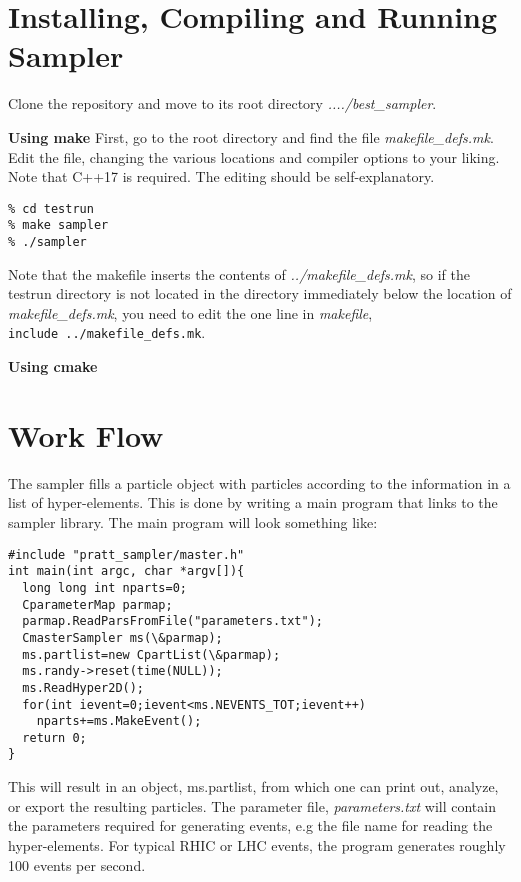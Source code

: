 



\section{Installing, Compiling and Running Sampler}

Clone the repository and move to its root directory {\it ..../best\_sampler}.

{\bf Using make}
First, go to the root directory and find the file {\it makefile\_defs.mk}. Edit the file, changing the various locations and compiler options to your liking. Note that C++17 is required. The editing should be self-explanatory.
{\tt\begin{verbatim}
% cd testrun
% make sampler
% ./sampler
\end{verbatim}}
Note that the makefile inserts the contents of {\it ../makefile\_defs.mk}, so if the testrun directory is not located in the directory immediately below the location of {\it makefile\_defs.mk}, you need to edit the one line in {\it makefile},\\
{\tt include ../makefile\_defs.mk}.

{\bf Using cmake}

\section{Work Flow}

The sampler fills a particle object with particles according to the information in a list of hyper-elements. This is done by writing a main program that links to the sampler library. The main program will look something like:

{\tt \begin{verbatim}
#include "pratt_sampler/master.h"
int main(int argc, char *argv[]){
  long long int nparts=0;
  CparameterMap parmap;
  parmap.ReadParsFromFile("parameters.txt");
  CmasterSampler ms(\&parmap);
  ms.partlist=new CpartList(\&parmap);
  ms.randy->reset(time(NULL));
  ms.ReadHyper2D();
  for(int ievent=0;ievent<ms.NEVENTS_TOT;ievent++)
    nparts+=ms.MakeEvent();
  return 0;
}
\end{verbatim}}
This will result in an object, ms.partlist, from which one can print out, analyze, or export the resulting particles. The parameter file, {\it parameters.txt} will contain the parameters required for generating events, e.g the file name for reading the hyper-elements. For typical RHIC or LHC events, the program generates roughly 100 events per second. 

